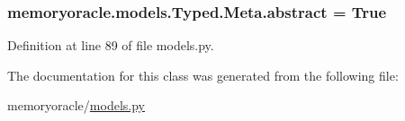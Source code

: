 \subsubsection[{abstract}]{\setlength{\rightskip}{0pt plus 5cm}memoryoracle.\+models.\+Typed.\+Meta.\+abstract = True\hspace{0.3cm}{\ttfamily [static]}}\label{classmemoryoracle_1_1models_1_1Typed_1_1Meta_a09bfecfa2da59fa84361b0dce162696f}


Definition at line 89 of file models.\+py.



The documentation for this class was generated from the following file\+:\begin{DoxyCompactItemize}
\item 
memoryoracle/\hyperlink{models_8py}{models.\+py}\end{DoxyCompactItemize}
